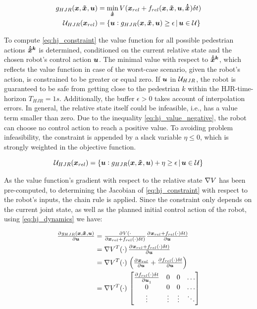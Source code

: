 \begin{align}
g_{HJR}(\x, \xped[], \u) &= \min_{\dxped[]} \Vrel(\xrel + \frel(\x, \xped[], \u, \dxped[]) \dt) \\
\uset_{HJR} (\xrel) &= \{ \u: g_{HJR}(\x, \xped[], \u) \geq \epsilon  \, | \, \u \in \uset \}
\label{eq:hj_constraint}
\end{align}

To compute \ref{eq:hj_constraint} the value function for all possible pedestrian actions $\dxped[k]$ is determined, conditioned on the current relative state and the chosen robot's control action $\boldsymbol{u}$. The minimal value with respect to $\dxped[k]$, which reflects the value function in case of the worst-case scenario, given the robot's action, is constrained to be greater or equal zero. If $\boldsymbol{u}$ in $\mathcal{U}_{HJR}$, the robot is guaranteed to be safe from getting close to the pedestrian $k$ within the \ac{HJR}-time-horizon $T_{HJR} = 1s$. Additionally, the buffer $\epsilon > 0$ takes account of interpolation errors.
\newline
In general, the relative state itself could be infeasible, i.e., has a value term smaller than zero. Due to the inequality \ref{eq:hj_value_negative}, the robot can choose no control action to reach a positive value. To avoiding problem infeasibility, the constraint is appended by a slack variable $\eta \leq 0$, which is strongly weighted in the objective function.

\begin{equation}
\uset_{HJR} (\xrel) = \{ \u: g_{HJR}(\x, \xped[], \u) + \eta \geq \epsilon  \, | \, \u \in \uset \}
\end{equation}

As the value function's gradient with respect to the relative state $\nabla V$ has been pre-computed, to determining the Jacobian of \ref{eq:hj_constraint} with respect to the robot's inputs, the chain rule is applied. Since the constraint only depends on the current joint state, as well as the planned initial control action of the robot, using \ref{eq:hj_dynamics} we have:

\begin{align}
\pd{g_{HJR}(\x, \xped[], \u)}{\u} &= \pd{\Vrel(\cdot}{\xrel + \frel(\cdot) \dt)} \pd{\xrel + \frel(\cdot) \dt)}{\u} \\
&= \nabla \Vrel^T(\cdot) \, \pd{\xrel + \frel(\cdot) \dt)}{\u} \\
&= \nabla \Vrel^T(\cdot) \, \left( \pd{\xrel}{\u} + \pd{\frel(\cdot) \dt}{\u} \right) \\
&= \nabla \Vrel^T(\cdot) \, \begin{bmatrix}
\pd{\frel(\cdot) \dt}{\u_1} & 0 & 0 & \hdots \\
0 & 0 & 0 & \hdots \\
\vdots & \vdots & \vdots & \ddots \\
\end{bmatrix}
\end{align}

